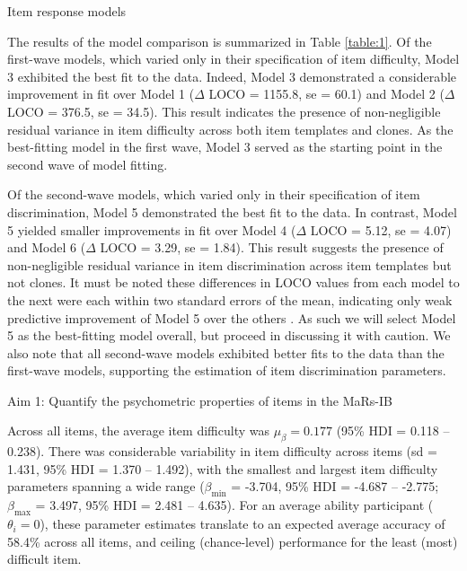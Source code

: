 \documentclass[a4paper,man,natbib,noextraspace]{apa6}
\makeatletter
\renewcommand{\subsubsection}{\@startsection{subsubsection}{3}
  {\z@}%
  {\b@level@two@skip}{\e@level@two@skip}%
  {\normalfont\normalsize\bfseries}}
\makeatother
\begin{document}
\subsubsection{Item response models}

The results of the model comparison is summarized in Table \ref{table:1}. Of the first-wave models, which varied only in their specification of item difficulty, Model 3 exhibited the best fit to the data. Indeed, Model 3 demonstrated a considerable improvement in fit over Model 1 ($\Delta$ LOCO = 1155.8, se = 60.1) and Model 2 ($\Delta$ LOCO = 376.5, se = 34.5). This result indicates the presence of non-negligible residual variance in item difficulty across both item templates and clones. As the best-fitting model in the first wave, Model 3 served as the starting point in the second wave of model fitting.

Of the second-wave models, which varied only in their specification of item discrimination, Model 5 demonstrated the best fit to the data. In contrast, Model 5 yielded smaller improvements in fit over Model 4 ($\Delta$ LOCO = 5.12, se = 4.07) and Model 6 ($\Delta$ LOCO = 3.29, se = 1.84). This result suggests the presence of non-negligible residual variance in item discrimination across item templates but not clones. It must be noted these differences in LOCO values from each model to the next were each within two standard errors of the mean, indicating only weak predictive improvement of Model 5 over the others \citep{vehtari2022cv}. As such we will select Model 5 as the best-fitting model overall, but proceed in discussing it with caution. We also note that all second-wave models exhibited better fits to the data than the first-wave models, supporting the estimation of item discrimination parameters.

\subsubsection{Aim 1: Quantify the psychometric properties of items in the MaRs-IB}

Across all items, the average item difficulty was $\mu_\beta = 0.177$ (95\% HDI = 0.118 -- 0.238). There was considerable variability in item difficulty across items (sd = 1.431, 95\% HDI = 1.370 -- 1.492), with the smallest  and largest item difficulty parameters spanning a wide range ($\beta_{\min}$ = -3.704, 95\% HDI = -4.687 -- -2.775; $\beta_{\max}$ = 3.497, 95\% HDI = 2.481 -- 4.635). For an average ability participant ($\theta_i = 0$), these parameter estimates translate to an expected average accuracy of 58.4\% across all items, and ceiling (chance-level) performance for the least (most) difficult item.
\end{document}
